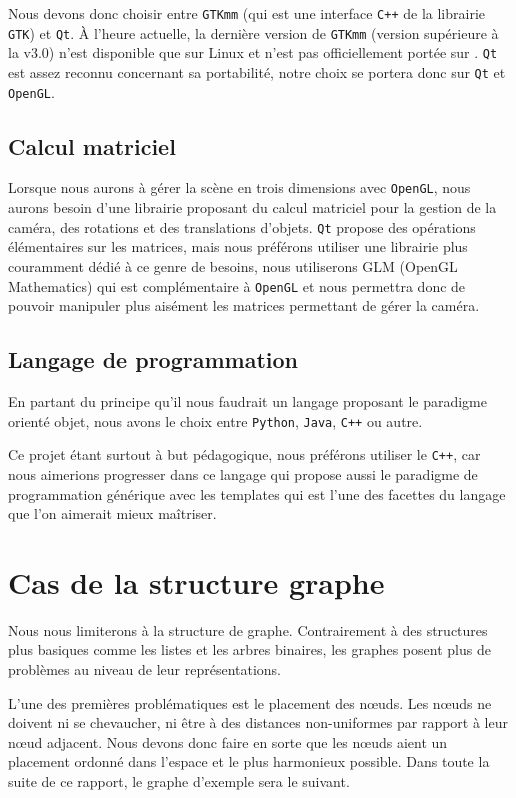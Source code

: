 \documentclass[a4paper, 11pt]{article}
\begin{document}
Nous devons donc choisir entre \texttt{GTKmm} (qui est une interface \texttt{C++} de la librairie \texttt{GTK}) et \texttt{Qt}. À l'heure actuelle, la dernière version de \texttt{GTKmm} (version supérieure à la v3.0) n'est disponible que sur Linux et n'est pas officiellement portée sur . \texttt{Qt} est assez reconnu concernant sa portabilité, notre choix se portera donc sur \texttt{Qt} et \texttt{OpenGL}.

\subsection{Calcul matriciel}
Lorsque nous aurons à gérer la scène en trois dimensions avec \texttt{OpenGL}, nous aurons besoin d'une librairie proposant du calcul matriciel pour la gestion de la caméra, des rotations et des translations d'objets. \texttt{Qt} propose des opérations élémentaires sur les matrices, mais nous préférons utiliser une librairie plus couramment dédié à ce genre de besoins, nous utiliserons GLM (OpenGL Mathematics) qui est complémentaire à \texttt{OpenGL} et nous permettra donc de pouvoir manipuler plus aisément les matrices permettant de gérer la caméra.

\subsection{Langage de programmation}
En partant du principe qu'il nous faudrait un langage proposant le paradigme orienté objet, nous avons le choix entre \texttt{Python}, \texttt{Java}, \texttt{C++} ou autre.

Ce projet étant surtout à but pédagogique, nous préférons utiliser le \texttt{C++}, car nous aimerions progresser dans ce langage qui propose aussi le paradigme de programmation générique avec les templates qui est l'une des facettes du langage que l'on aimerait mieux maîtriser.

\newpage
\section{Cas de la structure graphe}
Nous nous limiterons à la structure de graphe. Contrairement à des structures plus basiques comme les listes et les arbres binaires, les graphes posent plus de problèmes au niveau de leur représentations.

L'une des premières problématiques est le placement des nœuds. Les nœuds ne doivent ni se chevaucher, ni être à des distances non-uniformes par rapport à leur nœud adjacent. Nous devons donc faire en sorte que les nœuds aient un placement ordonné dans l'espace et le plus harmonieux possible. Dans toute la suite de ce rapport, le graphe d'exemple sera le suivant.
\end{document}
